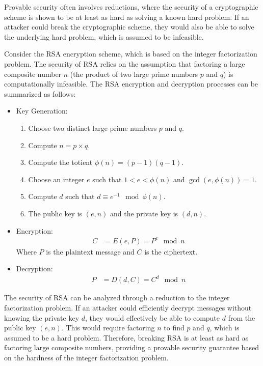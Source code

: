 \documentclass[openany]{book}
\begin{document}
Provable security often involves reductions, where the security of a cryptographic scheme is shown to be at least as hard as solving a known hard problem. If an attacker could break the cryptographic scheme, they would also be able to solve the underlying hard problem, which is assumed to be infeasible. \\
\begin{example}
    Consider the RSA encryption scheme, which is based on the integer factorization problem. The security of RSA relies on the assumption that factoring a large composite number \( n \) (the product of two large prime numbers \( p \) and \( q \)) is computationally infeasible. The RSA encryption and decryption processes can be summarized as follows:
    \begin{itemize}
        \item Key Generation:
        \begin{enumerate}
            \item Choose two distinct large prime numbers \( p \) and \( q \).
            \item Compute \( n = p \times q \).
            \item Compute the totient \( \phi(n) = (p-1)(q-1) \).
            \item Choose an integer \( e \) such that \( 1 < e < \phi(n) \) and \( \gcd(e, \phi(n)) = 1 \).
            \item Compute \( d \) such that \( d \equiv e^{-1} \mod \phi(n) \).
            \item The public key is \( (e, n) \) and the private key is \( (d, n) \).
        \end{enumerate}
        \item Encryption:
        \begin{align*}
            C &= E(e, P) = P^e \mod n
        \end{align*}
        Where \( P \) is the plaintext message and \( C \) is the ciphertext.
        \item Decryption:
        \begin{align*}
            P &= D(d, C) = C^d \mod n
        \end{align*}
    \end{itemize}
The security of RSA can be analyzed through a reduction to the integer factorization problem. If an attacker could efficiently decrypt messages without knowing the private key \( d \), they would effectively be able to compute \( d \) from the public key \( (e, n) \). This would require factoring \( n \) to find \( p \) and \( q \), which is assumed to be a hard problem. Therefore, breaking RSA is at least as hard as factoring large composite numbers, providing a provable security guarantee based on the hardness of the integer factorization problem.
\end{example}
\end{document}
